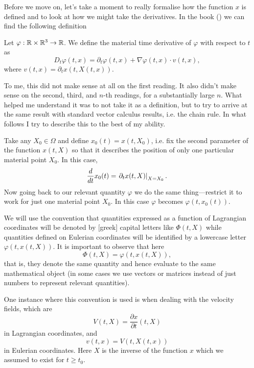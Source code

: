 Before we move on, let's take a moment to really formalise how the function $x$
is defined and to look at how we might take the derivatives. In the book
(\cite[p. 208]{eck2017mathematical}) we can find the following definition

\begin{dfn}

  Let $\varphi : \mathbb{R} \times \mathbb{R}^3 \to \mathbb{R}$. We define the material time derivative
  of $\varphi$ with respect to $t$ as
  \[
    D_t\varphi(t, x) = \partial_t \varphi(t, x) + \nabla \varphi(t, x) \cdot v(t, x),
  \]
  where $v(t, x) = \partial_t x(t, X(t, x))$.
\end{dfn}

To me, this did not make sense at all on the first reading. It also didn't make
sense on the second, third, and $n$-th readings, for a substantially large $n$.
What helped me understand it was to not take it as a definition, but to try to
arrive at the same result with standard vector calculus results, i.e. the chain
rule. In what follows I try to describe this to the best of my ability.

Take any $X_0 \in \Omega$ and define $x_0(t) = x(t, X_0)$, i.e. fix the second
parameter of the function $x(t, X)$ so that it describes the position of only
one particular material point $X_0$. In this case,
\[
  \frac{d}{dt} x_0(t) = \left. \partial_t x(t, X)\right|_{X = X_0}.
\]
Now going back to our relevant quantity $\varphi$ we do the same
thing---restrict it to work for just one material point $X_0$. In this case
$\varphi$ becomes $\varphi(t, x_0(t))$.







We will use the convention that quantities expressed as a function of
Lagrangian coordinates will be denoted by [greek] capital letters like $\Phi(t,
X)$ while quantities defined on Eulerian coordinates will be identified by a
lowercase letter $\varphi(t, x(t, X))$. It is important to observe that here
\[
  \Phi(t, X) = \varphi(t, x(t, X)),
\]
that is, they denote the same quantity and hence evaluate to the same
mathematical object (in some cases we use vectors or matrices instead of just
numbers to represent relevant quantities).

One instance where this convention is used is when dealing with the velocity
fields, which are
\[
  V(t, X) = \frac{\partial x}{\partial t}(t, X)
\]
in Lagrangian coordinates, and
\[
  v(t, x) = V(t, X(t, x))
\]
in Eulerian coordinates. Here $X$ is the inverse of the function $x$ which we
assumed to exist for $t \geq t_0$.

